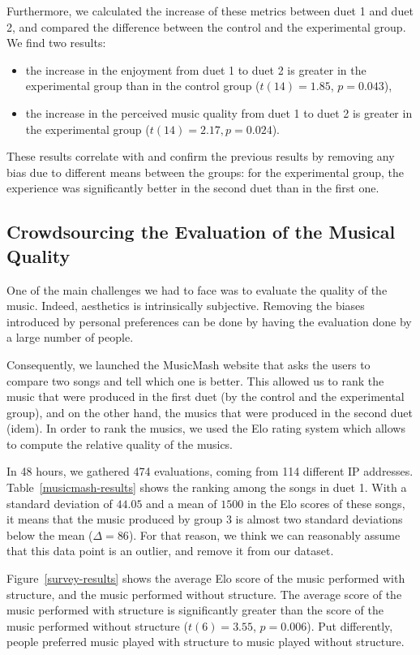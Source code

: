 \documentclass{article}
\begin{document}
Furthermore, we calculated the increase of these metrics between duet 1 and duet 2, and compared the difference between the control and the experimental group. We find two results:
\begin{itemize}
\item the increase in the enjoyment from duet 1 to duet 2 is greater in the experimental group than in the control group ($t(14) = 1.85$, $p = 0.043$),
\item the increase in the perceived music quality from duet 1 to duet 2 is greater in the experimental group ($t(14) = 2.17, p = 0.024$).
\end{itemize}
These results correlate with and confirm the previous results by removing any bias due to different means between the groups: for the experimental group, the experience was significantly better in the second duet than in the first one.


\subsection{Crowdsourcing the Evaluation of the Musical Quality}

One of the main challenges we had to face was to evaluate the quality of the music. Indeed, aesthetics is intrinsically subjective. Removing the biases introduced by personal preferences can be done by having the evaluation done by a large number of people.

Consequently, we launched the MusicMash website that asks the users to compare two songs and tell which one is better. This allowed us to rank the music that were produced in the first duet (by the control and the experimental group), and on the other hand, the musics that were produced in the second duet (idem). In order to rank the musics, we used the Elo rating system which allows to compute the relative quality of the musics.

In 48 hours, we gathered 474 evaluations, coming from 114 different IP addresses. Table~\ref{musicmash-results} shows the ranking among the songs in duet 1. With a standard deviation of $44.05$ and a mean of $1500$ in the Elo scores of these songs, it means that the music produced by group 3 is almost two standard deviations below the mean ($\Delta = 86$). For that reason, we think we can reasonably assume that this data point is an outlier, and remove it from our dataset.

Figure~\ref{survey-results} shows the average Elo score of the music performed with structure, and the music performed without structure. The average score of the music performed with structure is significantly greater than the score of the music performed without structure ($t(6) = 3.55$, $p = 0.006$). Put differently, people preferred music played with structure to music played without structure.
\end{document}
